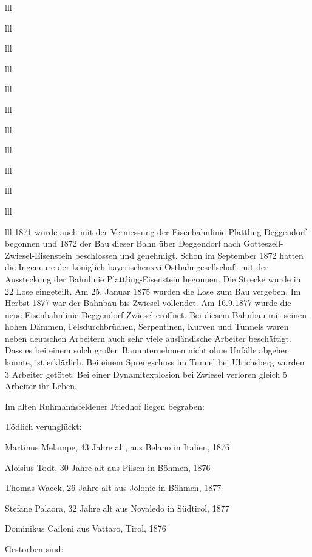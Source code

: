 \documentclass[12pt,a4pager]{book}
\begin{document}
\begin{tabuluar}{lll}
\begin{tabuluar}{lll}
\begin{tabuluar}{lll}
\begin{tabuluar}{lll}
\begin{tabuluar}{lll}
\begin{tabuluar}{lll}
\begin{tabuluar}{lll}
\begin{tabuluar}{lll}
\begin{tabuluar}{lll}
\begin{tabuluar}{lll}
\begin{tabuluar}{lll}
\begin{tabuluar}{lll}
1871 wurde auch mit der Vermessung der Eisenbahnlinie Plattling-Deggendorf
begonnen und 1872 der Bau dieser Bahn über Deggendorf nach
Gotteszell-Zwiesel-Eisenstein beschlossen und genehmigt. Schon im September 1872
hatten die Ingeneure der königlich bayerischenxvi Ostbahngesellschaft mit der
Aussteckung der Bahnlinie Plattling-Eisenstein begonnen. Die Strecke wurde in 22
Lose eingeteilt. Am 25. Januar 1875 wurden die Lose zum Bau vergeben. Im Herbst
1877 war der Bahnbau bis Zwiesel vollendet. Am 16.9.1877 wurde die neue
Eisenbahnlinie Deggendorf-Zwiesel eröffnet. Bei diesem Bahnbau mit seinen hohen
Dämmen, Felsdurchbrüchen, Serpentinen, Kurven und Tunnels waren neben deutschen
Arbeitern auch sehr viele ausländische Arbeiter beschäftigt. Dass es bei einem
solch großen Bauunternehmen nicht ohne Unfälle abgehen konnte, ist erklärlich.
Bei einem Sprengschuss im Tunnel bei Ulrichsberg wurden 3 Arbeiter getötet. Bei
einer Dynamitexplosion bei Zwiesel verloren gleich 5 Arbeiter ihr Leben.

Im alten Ruhmannsfeldener Friedhof liegen begraben:

Tödlich verunglückt:

\begin{compactitem}
\item Martinus Melampe, 43 Jahre alt, aus Belano in Italien, 1876
\item Aloisius Todt, 30 Jahre alt aus Pilsen in Böhmen, 1876
\item Thomas Wacek, 26 Jahre alt aus Jolonic in Böhmen, 1877
\item Stefane Palaora, 32 Jahre alt aus Novaledo in Südtirol, 1877
\item Dominikus Cailoni aus Vattaro, Tirol, 1876
\end{compactitem}

Gestorben sind:


\end{tabuluar}
\end{tabuluar}
\end{tabuluar}
\end{tabuluar}
\end{tabuluar}
\end{tabuluar}
\end{tabuluar}
\end{tabuluar}
\end{tabuluar}
\end{tabuluar}
\end{tabuluar}
\end{tabuluar}
\end{document}
